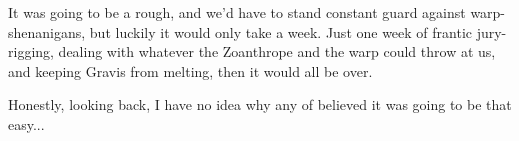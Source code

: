 It was going to be a rough, and we'd have to stand constant guard against warp-shenanigans, but luckily it would only take a week. 
Just one week of frantic jury-rigging, dealing with whatever the Zoanthrope and the warp could throw at us, and keeping Gravis from melting, then it would all be over.

Honestly, looking back, I have no idea why any of believed it was going to be that easy...
